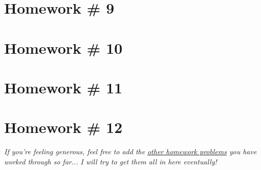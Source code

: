 \section{Homework \# 9}
\label{sec:HW9}

\section{Homework \# 10}
\label{sec:HW10}

\section{Homework \# 11}
\label{sec:HW11}

\section{Homework \# 12}
\label{sec:HW12}

\vspace{0.35cm}
\textit{If you're feeling generous, feel free to add the \href{https://www.dropbox.com/sh/759pwsjyc3ix0jy/AADBiIq0ZkDsvyEG6fMvSxJta/Abstract\%20Algebra\%20Homework\%20Sets?dl=0&subfolder_nav_tracking=1}{other homework problems} you have worked through so far... I will try to get them all in here eventually!}
